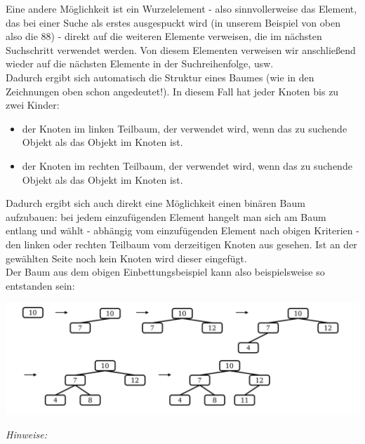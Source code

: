 \documentclass{article}
\begin{document}
Eine andere Möglichkeit ist ein Wurzelelement - also sinnvollerweise das Element, das bei einer Suche als erstes ausgespuckt wird (in unserem Beispiel von oben also die 88) - direkt auf die weiteren Elemente verweisen, die im nächsten Suchschritt verwendet werden. Von diesem Elementen verweisen wir anschließend wieder auf die nächsten Elemente in der Suchreihenfolge, usw. \\
Dadurch ergibt sich automatisch die Struktur eines Baumes (wie in den Zeichnungen oben schon angedeutet!). In diesem Fall hat jeder Knoten bis zu zwei Kinder:
\begin{itemize}
    \item der Knoten im linken Teilbaum, der verwendet wird, wenn das zu suchende Objekt  als das Objekt im Knoten ist.
    \item der Knoten im rechten Teilbaum, der verwendet wird, wenn das zu suchende Objekt  als das Objekt im Knoten ist.
\end{itemize}
Dadurch ergibt sich auch direkt eine Möglichkeit einen binären Baum aufzubauen: bei jedem einzufügenden Element hangelt man sich am Baum entlang und wählt - abhängig vom einzufügenden Element nach obigen Kriterien - den linken oder rechten Teilbaum vom derzeitigen Knoten aus gesehen. Ist an der gewählten Seite noch kein Knoten wird dieser eingefügt. \\
Der Baum aus dem obigen Einbettungsbeispiel kann also beispielsweise so entstanden sein: 
\begin{center}
    \includegraphics[scale=0.26]{../media/insertExample.png}
\end{center}
\textit{Hinweise:}
\end{document}
